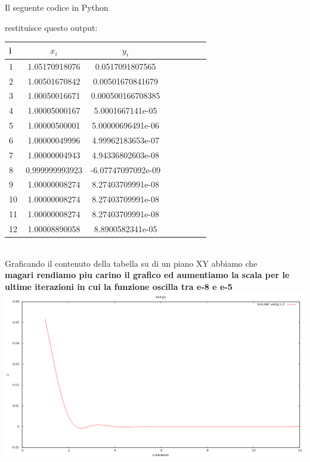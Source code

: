 Il seguente codice in Python


restituisce questo output:

\begin{tabular}{l*{6}{c}r}
i & \( x_i \) & \( y_i \)  \\
\hline
1 & 1.05170918076  &  0.0517091807565 \\
2 & 1.00501670842  &  0.00501670841679 \\
3 & 1.00050016671  &  0.000500166708385 \\
4 & 1.00005000167  &  5.0001667141e-05 \\
5 & 1.00000500001  &  5.00000696491e-06 \\
6 & 1.00000049996  &  4.99962183653e-07 \\
7 & 1.00000004943  &  4.94336802603e-08 \\
8 & 0.999999993923  &  -6.07747097092e-09 \\
9 & 1.00000008274  &  8.27403709991e-08 \\
10 & 1.00000008274  &  8.27403709991e-08 \\
11 & 1.00000008274  &  8.27403709991e-08 \\
12 & 1.00008890058  &  8.8900582341e-05 \\

\end{tabular} \\

Graficando il contenuto della tabella su di un piano XY abbiamo che \\

\textbf{magari rendiamo piu carino il grafico ed aumentiamo la scala per le ultime iterazioni in cui la funzione oscilla tra e-8 e e-5}\\

\includegraphics[scale=0.4]{cap_1/es4/es4.png}
